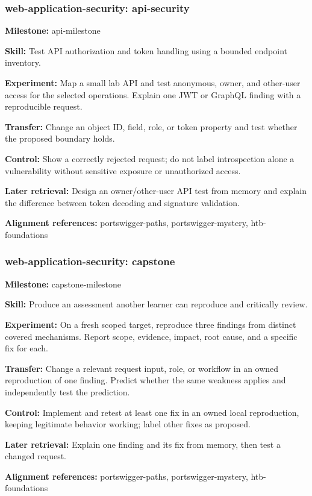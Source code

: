 \subsubsection{web-application-security: api-security}
\noindent\textbf{Milestone:} api-milestone\par
\noindent\textbf{Skill:} Test API authorization and token handling using a bounded endpoint inventory.\par
\noindent\textbf{Experiment:} Map a small lab API and test anonymous, owner, and other-user access for the selected operations. Explain one JWT or GraphQL finding with a reproducible request.\par
\noindent\textbf{Transfer:} Change an object ID, field, role, or token property and test whether the proposed boundary holds.\par
\noindent\textbf{Control:} Show a correctly rejected request; do not label introspection alone a vulnerability without sensitive exposure or unauthorized access.\par
\noindent\textbf{Later retrieval:} Design an owner/other-user API test from memory and explain the difference between token decoding and signature validation.\par
\noindent\textbf{Alignment references:} portswigger-paths, portswigger-mystery, htb-foundations\par
\subsubsection{web-application-security: capstone}
\noindent\textbf{Milestone:} capstone-milestone\par
\noindent\textbf{Skill:} Produce an assessment another learner can reproduce and critically review.\par
\noindent\textbf{Experiment:} On a fresh scoped target, reproduce three findings from distinct covered mechanisms. Report scope, evidence, impact, root cause, and a specific fix for each.\par
\noindent\textbf{Transfer:} Change a relevant request input, role, or workflow in an owned reproduction of one finding. Predict whether the same weakness applies and independently test the prediction.\par
\noindent\textbf{Control:} Implement and retest at least one fix in an owned local reproduction, keeping legitimate behavior working; label other fixes as proposed.\par
\noindent\textbf{Later retrieval:} Explain one finding and its fix from memory, then test a changed request.\par
\noindent\textbf{Alignment references:} portswigger-paths, portswigger-mystery, htb-foundations\par
